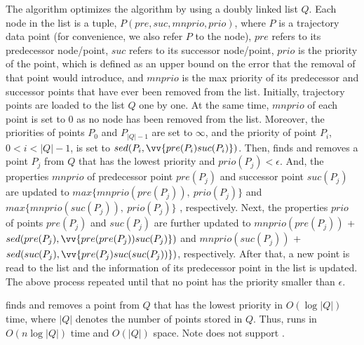 The \squishe algorithm optimizes the \tpa algorithm by using a doubly linked list $Q$. Each node in the list is a tuple, \ie $P(pre, suc, mnprio, prio)$, where $P$ is a trajectory data point (for convenience, we also refer $P$ to the node), $pre$ refers to its predecessor node/point, $suc$ refers to its successor node/point, $prio$ is the priority of the point, which is defined as an upper bound on the \sed error that the removal of that point would introduce, and $mnprio$ is the max priority of its predecessor and successor points that have ever been removed from the list.
%
Initially, trajectory points are loaded to the list $Q$ one by one.
At the same time, $mnprio$ of each point is set to $0$ as no node has been removed from the list.
Moreover, the priorities of points $P_0$ and $P_{|Q|-1}$ are set to $\infty$, and the priority of point $P_i$, $0<i<|Q|-1$, is set to $sed(P_i, \vv{pre(P_{i})suc(P_{i})})$.
%
Then, \squishe finds and removes a point $P_j$ from $Q$ that has the lowest priority and $prio(P_j)<\epsilon$.
And, the properties $mnprio$ of predecessor point $pre(P_j)$ and successor point $suc(P_j)$ are updated to $max\{mnprio(pre(P_j)), ~prio(P_j)\}$ and $max\{mnprio(suc(P_j)), ~prio(P_j)\}$ , respectively.
Next, the properties $prio$ of points $pre(P_j)$ and $suc(P_j)$ are further updated to $mnprio(pre(P_j))$ + $sed(pre(P_j), \vv{pre(pre(P_{j}))suc(P_{j})})$ and $mnprio(suc(P_j))$ + $sed(suc(P_j),\vv{pre(P_{j})suc(suc(P_{j}))})$, respectively.
%
After that, a new point is read to the list and the information of its predecessor point in the list is updated.
%
The above process repeated until that no point has the priority smaller than $\epsilon$. %

\squishe finds and removes a point from $Q$ that has the lowest priority in $O(\log |Q|)$ time, where $|Q|$ denotes the number of points stored in $Q$.
Thus, \squishe runs in $O(n\log |Q|)$ time and $O(|Q|)$ space. Note \squishe does not support \ped.

